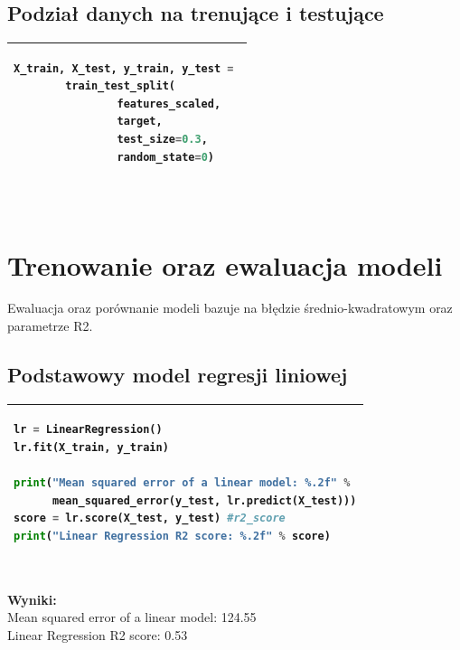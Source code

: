 \documentclass[11pt, a4paper]{article}
\begin{document}
\subsection{Podział danych na trenujące i testujące}

    \vspace{0.5cm} 
    \begin{tabular}{|l|}
        \hline
        \begin{lstlisting}[language=Python]
X_train, X_test, y_train, y_test = 
		train_test_split(
        		features_scaled, 
        		target, 
        		test_size=0.3, 
        		random_state=0)
        \end{lstlisting}
        \\ \hline
    \end{tabular}
    \vspace{0.5cm} \\

\newpage
\section{Trenowanie oraz ewaluacja modeli}
Ewaluacja oraz porównanie modeli bazuje na błędzie średnio-kwadratowym oraz parametrze R2.

\subsection{Podstawowy model regresji liniowej}
    \vspace{0.5cm} 
    \begin{tabular}{|l|}
        \hline
        \begin{lstlisting}[language=Python]
lr = LinearRegression()
lr.fit(X_train, y_train)

print("Mean squared error of a linear model: %.2f" % 
      mean_squared_error(y_test, lr.predict(X_test)))
score = lr.score(X_test, y_test) #r2_score
print("Linear Regression R2 score: %.2f" % score)
        \end{lstlisting}
        \\ \hline
    \end{tabular}
    \vspace{0.5cm} \\

\textbf{Wyniki:}\\
Mean squared error of a linear model: 124.55\\
Linear Regression R2 score: 0.53\\
\end{document}
